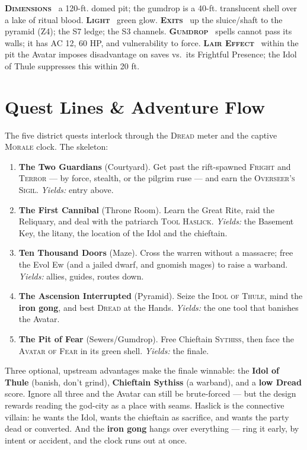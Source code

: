 \documentclass[10pt,twoside]{article}
\newcommand{\tech}[1]{\textbf{\scshape\textcolor{stone}{#1}}\ }
\newcommand{\eqname}[1]{\textsc{#1}}
\begin{document}
\begin{techbox}
\tech{Dimensions} a 120-ft. domed pit; the gumdrop is a 40-ft. translucent shell over
a lake of ritual blood. \tech{Light} green glow. \tech{Exits} up the sluice/shaft to
the pyramid (Z4); the S7 ledge; the S3 channels. \tech{Gumdrop} spells cannot pass
its walls; it has AC 12, 60 HP, and vulnerability to force. \tech{Lair Effect} within
the pit the Avatar imposes disadvantage on saves vs.\ its Frightful Presence; the
Idol of Thule suppresses this within 20 ft.
\end{techbox}
\clearpage
\section{Quest Lines \& Adventure Flow}

The five district quests interlock through the \eqname{Dread} meter and the captive
\eqname{Morale} clock. The skeleton:

\begin{enumerate}
\item \textbf{The Two Guardians} (Courtyard). Get past the rift-spawned \eqname{Fright}
and \eqname{Terror} --- by force, stealth, or the pilgrim ruse --- and earn the
\eqname{Overseer's Sigil}. \emph{Yields:} entry above.
\item \textbf{The First Cannibal} (Throne Room). Learn the Great Rite, raid the
Reliquary, and deal with the patriarch \eqname{Tool Haslick}. \emph{Yields:} the
Basement Key, the litany, the location of the Idol and the chieftain.
\item \textbf{Ten Thousand Doors} (Maze). Cross the warren without a massacre; free the
Evol Ew (and a jailed dwarf, and gnomish mages) to raise a warband. \emph{Yields:}
allies, guides, routes down.
\item \textbf{The Ascension Interrupted} (Pyramid). Seize the \eqname{Idol of Thule},
mind the \textbf{iron gong}, and best \eqname{Dread} at the Hands. \emph{Yields:} the
one tool that banishes the Avatar.
\item \textbf{The Pit of Fear} (Sewers/Gumdrop). Free Chieftain \eqname{Sythiss}, then
face the \eqname{Avatar of Fear} in its green shell. \emph{Yields:} the finale.
\end{enumerate}

\begin{dmnote}
Three optional, upstream advantages make the finale winnable: the \textbf{Idol of
Thule} (banish, don't grind), \textbf{Chieftain Sythiss} (a warband), and a
\textbf{low Dread} score. Ignore all three and the Avatar can still be brute-forced ---
but the design rewards reading the god-city as a place with seams. Haslick is the
connective villain: he wants the Idol, wants the chieftain as sacrifice, and wants the
party dead or converted. And the \textbf{iron gong} hangs over everything --- ring it
early, by intent or accident, and the clock runs out at once.
\end{dmnote}
\end{document}

